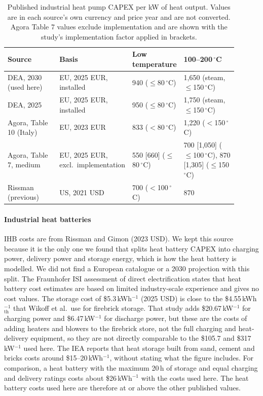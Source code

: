 \documentclass[11pt]{article}
\begin{document}
\begin{table}[h]
\centering
\footnotesize
\caption{Published industrial heat pump CAPEX per kW of heat output. Values are in each source's own currency and price year and are not converted. Agora Table 7 values exclude implementation and are shown with the study's implementation factor applied in brackets.}
\label{tab:hpcost}
\begin{tabular}{p{0.24\linewidth} p{0.22\linewidth} p{0.18\linewidth} p{0.26\linewidth}}
\toprule
Source & Basis & Low temperature & 100--200\,$^\circ$C \\
\midrule
DEA, 2030 (used here)\cite{dea2026processheat} & EU, 2025 EUR, installed & 940 ($\leq$80\,$^\circ$C) & 1,650 (steam, $\leq$150\,$^\circ$C) \\
DEA, 2025\cite{dea2026processheat} & EU, 2025 EUR, installed & 950 ($\leq$80\,$^\circ$C) & 1,750 (steam, $\leq$150\,$^\circ$C) \\
Agora, Table 10 (Italy)\cite{agora2026business} & EU, 2023 EUR & 833 ($<$80\,$^\circ$C) & 1,220 ($<$150\,$^\circ$C) \\
Agora, Table 7, medium\cite{agora2026business} & EU, 2025 EUR, excl.\ implementation & 550 [660] ($\leq$80\,$^\circ$C) & 700 [1,050] ($\leq$100\,$^\circ$C), 870 [1,305] ($\leq$150\,$^\circ$C) \\
Rissman (previous)\cite{rissman2020} & US, 2021 USD & 700 ($<$100\,$^\circ$C) & 870 \\
\bottomrule
\end{tabular}
\end{table}

\paragraph*{Industrial heat batteries}
IHB costs are from Rissman and Gimon\cite{rissman2023ihb} (2023 USD). We kept this source because it is the only one we found that splits heat battery CAPEX into charging power, delivery power and storage energy, which is how the heat battery is modelled. We did not find a European catalogue or a 2030 projection with this split. The Fraunhofer ISI assessment of direct electrification states that heat battery cost estimates are based on limited industry-scale experience and gives no cost values\cite{fraunhofer2024directelec}. The storage cost of \$5.3\,kWh$^{-1}$ (2025 USD) is close to the \$4.55\,kWh$_\mathrm{th}^{-1}$ that Wikoff et al.\ use for firebrick storage\cite{wikoff2025}. That study adds \$20.67\,kW$^{-1}$ for charging power and \$6.47\,kW$^{-1}$ for discharge power, but these are the costs of adding heaters and blowers to the firebrick store, not the full charging and heat-delivery equipment, so they are not directly comparable to the \$105.7 and \$317\,kW$^{-1}$ used here. The IEA reports that heat storage built from sand, cement and bricks costs around \$15--20\,kWh$^{-1}$, without stating what the figure includes\cite{iea2026renewablesindustry}. For comparison, a heat battery with the maximum 20\,h of storage and equal charging and delivery ratings costs about \$26\,kWh$^{-1}$ with the costs used here. The heat battery costs used here are therefore at or above the other published values.
\end{document}
